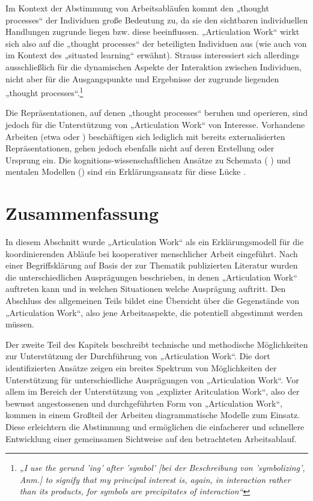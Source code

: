 Im Kontext der Abstimmung von Arbeitsabläufen kommt den „thought processes“ der Individuen große Bedeutung zu, da sie den sichtbaren individuellen Handlungen zugrunde liegen bzw. diese beeinflussen. „Articulation Work“ wirkt sich also auf die „thought processes“ der beteiligten Individuen aus (wie auch von \citet{Davenport02} im Kontext des „situated learning“ erwähnt). Strauss interessiert sich allerdings ausschließlich für die dynamischen Aspekte der Interaktion zwischen Individuen, nicht aber für die Ausgangspunkte und Ergebnisse der zugrunde liegenden „thought processes“.\footnote{\emph{„I use the gerund 'ing' after 'symbol' [bei der Beschreibung von 'symbolizing', Anm.] to signify that my principal interest is, again, in interaction rather than its products, for symbols are precipitates of interaction“}\citep[][S. 149]{Strauss93}} 

Die Repräsentationen, auf denen „thought processes“ beruhen und operieren, sind jedoch für die Unterstützung von „Articulation Work“ von Interesse. Vorhandene Arbeiten (etwa \citep{Herrmann02} oder \citep{Jorgensen04}) beschäftigen sich lediglich mit bereits externalisierten Repräsentationen, gehen jedoch ebenfalls nicht auf deren Erstellung oder Ursprung ein. Die kognitions-wissenschaftlichen Ansätze zu Schemata (\citep{Rumelhart78} \citep[vgl. nach ][]{Hanke06}) und mentalen Modellen (\citep[vgl. ][]{Seel91}) sind ein Erklärungsansatz für diese Lücke \citep{Herrmann02}.


\section{Zusammenfassung} %
\label{sec:aw_zusammenfassung}

In diesem Abschnitt wurde „Articulation Work“ als ein Erklärungsmodell für die koordinierenden Abläufe bei kooperativer menschlicher Arbeit eingeführt. Nach einer Begriffsklärung auf Basis der zur Thematik publizierten Literatur wurden die unterschiedlichen Ausprägungen beschrieben, in denen „Articulation Work“ auftreten kann und in welchen Situationen welche Ausprägung auftritt. Den Abschluss des allgemeinen Teils bildet eine Übersicht über die Gegenstände von „Articulation Work“, also jene Arbeitsaspekte, die potentiell abgestimmt werden müssen.

Der zweite Teil des Kapitels beschreibt technische und methodische Möglichkeiten zur Unterstützung der Durchführung von „Articulation Work“. Die dort identifizierten Ansätze zeigen ein breites Spektrum von Möglichkeiten der Unterstützung für unterschiedliche Ausprägungen von „Articulation Work“. Vor allem im Bereich der Unterstützung von „explizter Aritculation Work“, also der bewusst angestossenen und durchgeführten Form von „Articulation Work“, kommen in einem Großteil der Arbeiten diagrammatische Modelle zum Einsatz. Diese erleichtern die Abstimmung und ermöglichen die einfacherer und schnellere Entwicklung einer gemeinsamen Sichtweise auf den betrachteten Arbeitsablauf.

